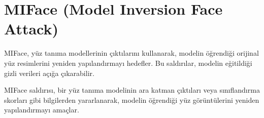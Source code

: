 \section{MIFace (Model Inversion Face Attack)}

MIFace, yüz tanıma modellerinin çıktılarını kullanarak, modelin öğrendiği orijinal yüz resimlerini yeniden yapılandırmayı hedefler. Bu saldırılar, modelin eğitildiği gizli verileri açığa çıkarabilir.

MIFace saldırısı, bir yüz tanıma modelinin ara katman çıktıları veya sınıflandırma skorları gibi bilgilerden yararlanarak, modelin öğrendiği yüz görüntülerini yeniden yapılandırmayı amaçlar. 

\newpage